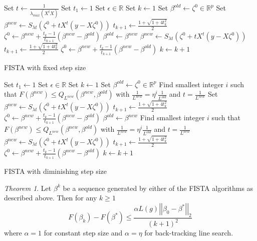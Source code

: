 \documentclass[12pt, leqno]{article}
\newcommand{\norm}[1]{\left|\left|#1\right|\right|}
\theoremstyle{remark}
\newtheorem{thm}{Theorem}
\begin{document}
\begin{algorithm}[H]
\begin{algorithmic}
\State Set $t \gets \frac{1}{\lambda_{max}(X^t X)}$
\State Set $t_1 \gets 1$
\State Set $\epsilon \in \mathbb{R}$
\State Set $k \gets 1$
\State Set $\beta^{old} \gets \zeta^0 \in \mathbb{R}^p$
\State Set $\beta^{new} \gets S_{\lambda t} (\zeta^0 + t X^t (y -
X \zeta^0))$
\State $t_{k+1} \gets \frac{1 + \sqrt{1+4t_k^2}}{2}$
\State $\zeta^{0} \gets \beta^{new} + \frac{t_k-1}{t_{k+1}}(\beta^{new} - \beta^{old})$
\While {$\norm{\beta^{new} - \beta^{old}}_{\infty} \geq \epsilon$}
	\State $\beta^{old} \gets \beta^{new}$
   \State $\beta^{new} \gets S_{\lambda t} (\zeta^0 + t X^t (y -
X \zeta^{0}))$
\State $t_{k+1} \gets \frac{1 + \sqrt{1+4t_k^2}}{2}$
\State $\zeta^{0} \gets \beta^{new} + \frac{t_k-1}{t_{k+1}}(\beta^{new} - \beta^{old})$
\State $k \gets k+1$
    \EndWhile
\end{algorithmic}
\caption{FISTA with fixed step size}
\end{algorithm}

\begin{algorithm}[H]
\begin{algorithmic}
\State Set $t_1 \gets 1$
\State Set $\epsilon \in \mathbb{R}$
\State Set $k \gets 1$
\State Set $\beta^{old} \gets \zeta^0 \in \mathbb{R}^p$
\State Find smallest integer $i$ such that $F(\beta^{new}) \leq Q_{L^{new}}(\beta^{new},\beta^{old})$ with $\frac{1}{L^{new}} = \eta^i \frac{1}{L^{old}}$ and $t = \frac{1}{L^{new}}$
\State Set $\beta^{new} \gets S_{\lambda t} (\zeta^0 + t X^t (y -
X \zeta^0))$
\State $t_{k+1} \gets \frac{1 + \sqrt{1+4t_k^2}}{2}$
\State $\zeta^{0} \gets \beta^{new} + \frac{t_k-1}{t_{k+1}}(\beta^{new} - \beta^{old})$
\While {$\norm{\beta^{new} - \beta^{old}}_{\infty} \geq \epsilon$}
	\State $\beta^{old} \gets \beta^{new}$
\State Find smallest integer $i$ such that $F(\beta^{new}) \leq Q_{L^{new}}(\beta^{new},\beta^{old})$ with $\frac{1}{L^{new}} = \eta^i \frac{1}{L^{old}}$ and $t = \frac{1}{L^{new}}$
   \State $\beta^{new} \gets S_{\lambda t} (\zeta^0 + t X^t (y -
X \zeta^{0}))$
\State $t_{k+1} \gets \frac{1 + \sqrt{1+4t_k^2}}{2}$
\State $\zeta^{0} \gets \beta^{new} + \frac{t_k-1}{t_{k+1}}(\beta^{new} - \beta^{old})$
\State $k \gets k+1$
    \EndWhile
\end{algorithmic}
\caption{FISTA with diminishing step size}
\end{algorithm}

\begin{thm}
Let $\beta^k$ be a sequence generated by either of the FISTA algorithms as described above. Then for any $k\geq 1$
$$
F(\beta_k) - F(\beta^*) \leq \frac{\alpha L(g) \norm{\beta_0 - \beta^*}_2}{(k+1)^2}
$$
where $\alpha = 1$ for constant step size and $\alpha = \eta$ for back-tracking line search.
\end{thm}
\end{document}
